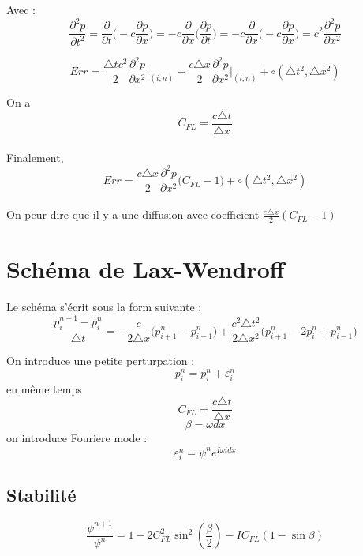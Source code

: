 \documentclass[a4paper,10pt]{report} %
\begin{document}
Avec :
$$\frac{\partial^2 p}{\partial t^2}=\frac{\partial }{\partial t}\Big(-c\frac{\partial p}{\partial x}\Big)=-c\frac{\partial }{\partial x}\Big(\frac{\partial p}{\partial t}\Big)=-c\frac{\partial }{\partial x}\Big(-c\frac{\partial p}{\partial x}\Big)=c^2\frac{\partial^2 p}{\partial x^2}$$

\begin{equation}
Err=\frac{\triangle tc^2}{2}\frac{\partial^2 p}{\partial x^2}\Big|_{(i,n)}-\frac{c\triangle x}{2}\frac{\partial^2 p}{\partial x^2}\Big|_{(i,n)}+\circ(\triangle t^2,\triangle x^2)
\end{equation}

On a $$C_{FL}=\frac{c\triangle t}{\triangle x}$$ 
\\

Finalement,
\begin{equation}
Err=\frac{c\triangle x}{2}\frac{\partial^2 p}{\partial x^2}\Big(C_{FL}-1\Big)+\circ(\triangle t^2,\triangle x^2)
\end{equation}
\\

On peur dire que il y a une diffusion avec coefficient $\frac{c\triangle x}{2}(C_{FL}-1)$


\section{Schéma de Lax-Wendroff}
Le schéma s'écrit sous la form suivante :
\begin{equation}
\frac{p^{n+1}_i-p^{n}_i}{\triangle t}= -\frac{c}{2\triangle x}\Big(p^{n}_{i+1}-p^{n}_{i-1}\Big)+\frac{c^2\triangle t^2}{2\triangle x^2}\Big(p^{n}_{i+1}-2p^{n}_{i}+p^{n}_{i-1}\Big)
\end{equation}

On introduce une petite perturpation :
\begin{equation}
p^n_i=p^n_i+\varepsilon^n_i
\end{equation}
en même temps
$$C_{FL}=\frac{c\triangle t}{\triangle x}$$
$$\beta=\omega dx$$
on introduce Fouriere mode :
\begin{equation}
\varepsilon^n_i=\psi ^ne^{I\omega i dx}
\end{equation}
\subsection{Stabilité}
\begin{equation}
\frac{\psi^{n+1}}{\psi^n}=1-2C_{FL}^2\sin^2(\frac{\beta}{2})-IC_{FL}(1-\sin\beta)
\end{equation}
\end{document}
